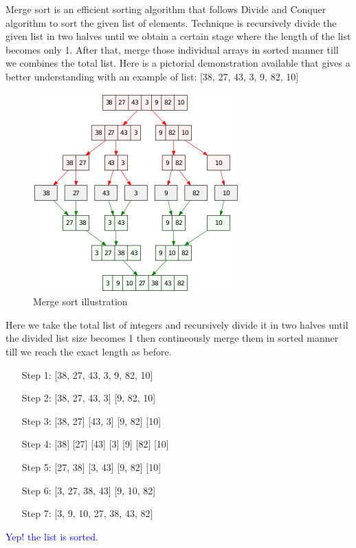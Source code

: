 \justify
{
Merge sort is an efficient sorting algorithm that follows Divide and Conquer algorithm to sort the given list of elements. Technique is recursively divide the given list in two halves until we obtain a certain stage where the length of the list becomes only 1. After that, merge those individual arrays in sorted manner till we combines the total list. Here is a pictorial demonstration available that gives a better understanding with an example of list: [38, 27, 43, 3, 9, 82, 10]\\
}
\begin{figure}[h!]
\includegraphics[scale=0.7]{Pictures/300px-Merge_sort_algorithm_diagram.svg.png}
\centering
\caption{Merge sort illustration}
\end{figure}
Here we take the total list of integers and recursively divide it in two halves until the divided list size becomes 1 then contineously merge them in sorted manner till we reach the exact length as before.
\begin{enumerate}
	\item[Step 1:] [38, 27, 43, 3, 9, 82, 10]
	\item[Step 2:] [38, 27, 43, 3] [9, 82, 10]
	\item[Step 3:] [38, 27] [43, 3] [9, 82] [10]
	\item[Step 4:] [38] [27] [43] [3] [9] [82] [10]
	\item[Step 5:] [27, 38] [3, 43] [9, 82] [10]
	\item[Step 6:] [3, 27, 38, 43] [9, 10, 82]
	\item[Step 7:] [3, 9, 10, 27, 38, 43, 82]
\end{enumerate}
\textcolor{blue}{Yep! the list is sorted.}